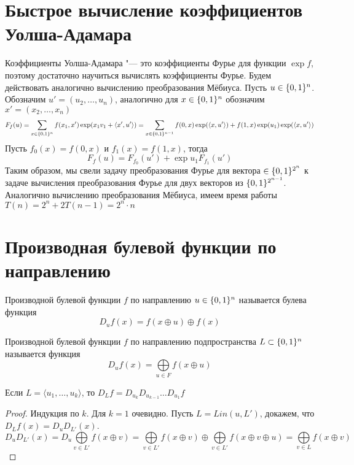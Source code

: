 \section{Быстрое вычисление коэффициентов Уолша-Адамара}

Коэффициенты Уолша-Адамара "--- это коэффициенты Фурье для функции
$\exp f$, поэтому достаточно научиться вычислять коэффициенты Фурье.
Будем действовать аналогично вычислению преобразования Мёбиуса.
Пусть $u \in \{0,1\}^n$. Обозначим $u' = (u_2, \ldots, u_n)$, аналогично для
$x \in \{0,1\}^n$ обозначим $x' = (x_2, \ldots, x_n)$
$$F_f (u) = \sum\limits_{x \in \{0,1\}^n} f(x_1, x') \exp (x_1 v_1 + \langle x', u' \rangle)
 = \sum\limits_{x \in \{0,1\}^{n-1}} f(0, x) \exp(\langle x, u' \rangle)
 + f(1, x) \exp(u_1) \exp(\langle x, u' \rangle)$$
Пусть $f_0(x) = f(0, x)$ и $f_1(x) = f(1,x)$, тогда
$$F_f(u) = F_{f_0} (u') + \exp{u_1} F_{f_1} (u')$$
Таким образом, мы свели задачу преобразования Фурье для вектора
$\in \{0,1\}^{2^n}$ к задаче вычисления преобразования Фурье для двух 
векторов из $\{0,1\}^{2^{n-1}}$. Аналогично вычислению преобразования
Мёбиуса, имеем время работы $T(n) = 2^n + 2T(n-1) = 2^n \cdot n$

\section{Производная булевой функции по направлению}

\begin{definition}
Производной булевой функции $f$ по направлению $u \in \{0,1\}^n$ называется
булева функция $$D_u f (x) = f(x \oplus u) \oplus f(x)$$
\end{definition}

\begin{definition}
Производной булевой функции $f$ по направлению подпространства $L \subset \{0,1\}^n$
называется функция
$$D_u f (x) = \bigoplus\limits_{u \in F} f(x \oplus u)$$

\end{definition}

\begin{remark}
Если $L = \langle u_1, \ldots, u_k \rangle$, то $D_L f = D_{u_k} D_{u_{k-1}} \ldots D_{u_1} f$
\end{remark}
\begin{proof}
Индукция по $k$. Для $k=1$ очевидно. Пусть $L = Lin (u, L')$,
докажем, что $D_L f (x) = D_u D_{L'} (x)$.
\[
D_u D_{L'} (x) = D_u \bigoplus\limits_{v \in L'} f(x \oplus v) = 
\bigoplus\limits_{v \in L'} f(x \oplus v) \oplus \bigoplus\limits_{v \in L'} f(x \oplus v \oplus u) 
= \bigoplus\limits_{v \in L} f(x \oplus v)
\]
\end{proof}

